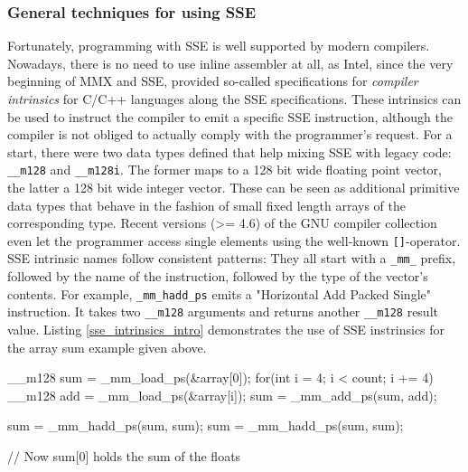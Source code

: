 \subsubsection{General techniques for using SSE}
Fortunately, programming with SSE is well supported by modern compilers. Nowadays, there is no need to use inline assembler at all, as Intel, since the very beginning of MMX and SSE, provided so-called specifications for \emph{compiler intrinsics} for C/C++ languages along the SSE specifications. These intrinsics can be used to instruct the compiler to emit a specific SSE instruction, although the compiler is not obliged to actually comply with the programmer's request. For a start, there were two data types defined that help mixing SSE with legacy code: \texttt{\_\_m128} and \texttt{\_\_m128i}. The former maps to a 128 bit wide floating point vector, the latter a 128 bit wide integer vector. These can be seen as additional primitive data types that behave in the fashion of small fixed length arrays of the corresponding type. Recent versions (>= 4.6) of the GNU compiler collection even let the programmer access single elements using the well-known \texttt{[]}-operator. SSE intrinsic names follow consistent patterns: They all start with a \texttt{\_mm\_} prefix, followed by the name of the instruction, followed by the type of the vector's contents. For example, \texttt{\_mm\_hadd\_ps} emits a "Horizontal Add Packed Single" instruction. It takes two \texttt{\_\_m128} arguments and returns another \texttt{\_\_m128} result value. Listing \ref{sse_intrinsics_intro} demonstrates the use of SSE instrinsics for the array sum example given above.
\begin{code}[caption={Array sum using SSE instrinsics}, label=sse_intrinsics_intro]
  __m128 sum = _mm_load_ps(&array[0]);
  for(int i = 4; i < count; i += 4) {
    __m128 add = _mm_load_ps(&array[i]);
    sum = _mm_add_ps(sum, add);
  }

  sum = _mm_hadd_ps(sum, sum);
  sum = _mm_hadd_ps(sum, sum);

  // Now sum[0] holds the sum of the floats
\end{code}

